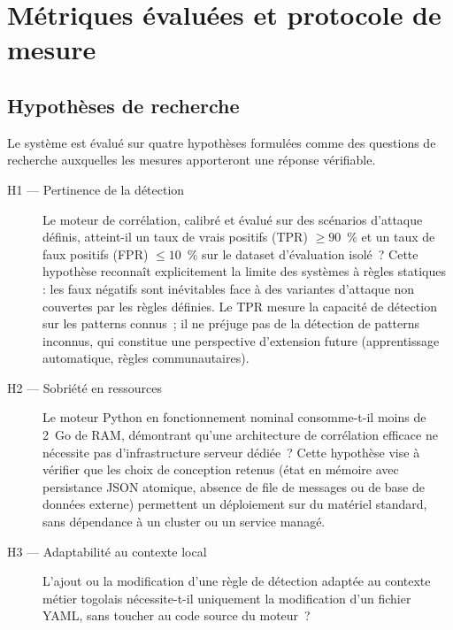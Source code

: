 \documentclass[12pt,a4paper]{article}
\begin{document}
\section{Métriques évaluées et protocole de mesure}

\subsection{Hypothèses de recherche}

Le système est évalué sur quatre hypothèses formulées comme des
questions de recherche auxquelles les mesures apporteront une réponse
vérifiable.

\begin{description}
    \item[H1 --- Pertinence de la détection]
    Le moteur de corrélation, calibré et évalué sur des scénarios
    d'attaque définis, atteint-il un taux de vrais positifs (TPR)
    $\geq 90$~\% et un taux de faux positifs (FPR) $\leq 10$~\%
    sur le dataset d'évaluation isolé~?
    Cette hypothèse reconnaît explicitement la limite des systèmes
    à règles statiques : les faux négatifs sont inévitables face à
    des variantes d'attaque non couvertes par les règles définies.
    Le TPR mesure la capacité de détection sur les patterns connus~;
    il ne préjuge pas de la détection de patterns inconnus, qui
    constitue une perspective d'extension future (apprentissage
    automatique, règles communautaires).

\item[H2 --- Sobriété en ressources]
    Le moteur Python en fonctionnement nominal consomme-t-il moins
    de 2~Go de RAM, démontrant qu'une architecture de corrélation
    efficace ne nécessite pas d'infrastructure serveur dédiée~?
    Cette hypothèse vise à vérifier que les choix de conception
    retenus (état en mémoire avec persistance JSON atomique,
    absence de file de messages ou de base de données externe)
    permettent un déploiement sur du matériel standard, sans
    dépendance à un cluster ou un service managé.

    \item[H3 --- Adaptabilité au contexte local]
    L'ajout ou la modification d'une règle de détection adaptée
    au contexte métier togolais nécessite-t-il uniquement la
    modification d'un fichier YAML, sans toucher au code source
    du moteur~?


\end{description}
\end{document}
